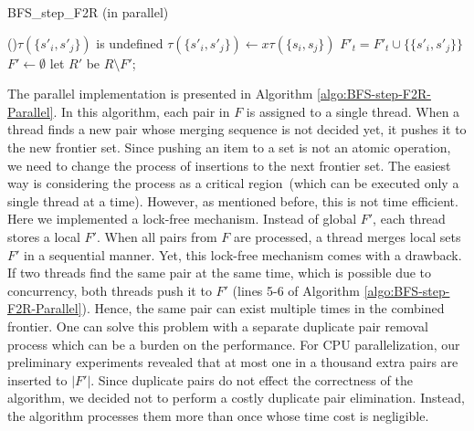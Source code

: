 \begin{algorithm}[ht]
	\caption{BFS\_step\_F2R (in parallel)}
	\label{algo:BFS-step-F2R-Parallel}
	
	
	{
		{
			{
				\If(){$\tau({\{ s'_i,s'_j \}})$ is undefined}
				{
					$\tau(\{ s'_i,s'_j\}) \longleftarrow x \tau(\{ s_i,s_j \})$\;
					$F'_t = F'_t \cup \{ \{ s'_i,s'_j \}  \} $\;
				}
			}
		}
	}
	$F' \longleftarrow \emptyset$\;
	let $R'$ be $R \setminus F'$;
\end{algorithm}

The parallel implementation is presented in Algorithm \ref{algo:BFS-step-F2R-Parallel}. In this algorithm, each pair in $F$ is assigned to a single thread. When a thread finds a new pair whose merging sequence is not decided yet, it pushes it to the new frontier set. Since pushing an item to a set is not an atomic operation, we need to change the process of insertions to the next frontier set. The easiest way is considering the process as a critical region~(which can be executed only a single thread at a time). However, as mentioned before, this is not time efficient. Here we implemented a lock-free mechanism. Instead of global $F'$, each thread stores a local $F'$. When all pairs from $F$ are processed, a thread merges local sets $F'$ in a sequential manner. Yet, this lock-free mechanism comes with a drawback. If two threads find the same pair at the same time, which is possible due to concurrency, both threads push it to $F'$ (lines 5-6 of Algorithm \ref{algo:BFS-step-F2R-Parallel}). Hence, the same pair can exist multiple times in the combined frontier. One can solve this problem with a separate duplicate pair removal process which can be a burden on the performance. For CPU parallelization, our preliminary experiments revealed that at most one in a thousand extra pairs are inserted to $|F'|$. Since duplicate pairs do not effect the correctness of the algorithm, we decided not to perform a costly duplicate pair elimination. Instead, the algorithm processes them more than once whose time cost is negligible. 

